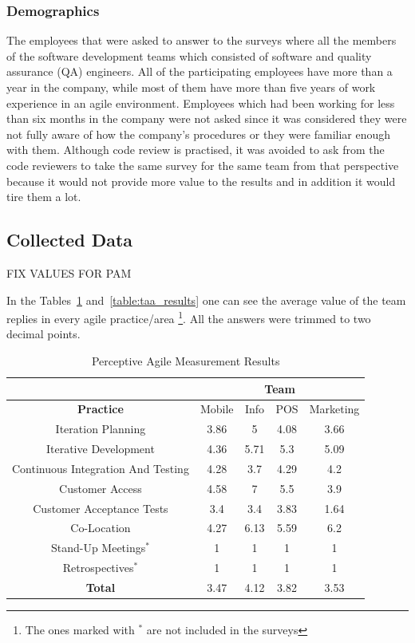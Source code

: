 \subsubsection{Demographics}
The employees that were asked to answer to the surveys where all the members of the software development teams which consisted of software and quality assurance (QA) engineers. All of the participating employees have more than a year in the company, while most of them have more than five years of work experience in an agile environment. Employees which had been working for less than six months in the company were not asked since it was considered they were not fully aware of how the company's procedures or they were familiar enough with them. Although code review is practised, it was avoided to ask from the code reviewers to take the same survey for the same team from that perspective because it would not provide more value to the results and in addition it would tire them a lot.

\subsection{Collected Data}


FIX VALUES FOR PAM


In the Tables~\ref{table:pam_results} and~\ref{table:taa_results} one can see the average value of the team replies in every agile practice/area \footnote{The ones  marked with $^\ast$ are not included in the surveys}. All the answers were trimmed to two decimal points.

\begin{table} [H]
\caption{Perceptive Agile Measurement Results}
\label{table:pam_results}
\begin{tabular}{| c | c | c | c | c |}
\hline
  & \multicolumn{4}{c|}{\textbf{Team}} \\ \hline
\textbf{Practice} & Mobile & Info & POS & Marketing \\ \hline
Iteration Planning & 3.86 & 5 & 4.08 & 3.66 \\ \hline
Iterative Development & 4.36 & 5.71 & 5.3 & 5.09 \\ \hline
Continuous Integration And Testing & 4.28 & 3.7 & 4.29 & 4.2 \\ \hline
Customer Access & 4.58 & 7 & 5.5 & 3.9 \\ \hline
Customer Acceptance Tests & 3.4 & 3.4 & 3.83 & 1.64 \\ \hline
Co-Location & 4.27 & 6.13 & 5.59 & 6.2 \\ \hline 
Stand-Up Meetings$^\ast$ & 1 & 1 & 1 & 1 \\ \hline
Retrospectives$^\ast$ & 1 & 1 & 1 & 1 \\ \hline
\textbf{Total} & 3.47 & 4.12 & 3.82 & 3.53 \\ \hline
\end{tabular}
\end{table}

